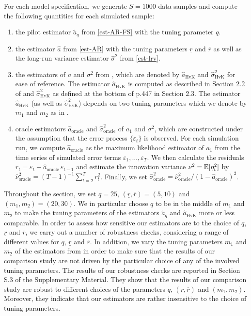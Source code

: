 For each model specification, we generate $S=1000$ data samples and compute the following quantities for each simulated sample: 
\begin{enumerate}[label=(\roman*),leftmargin=0.9cm]
\item the pilot estimator $\widetilde{a}_q$ from \eqref{est-AR-FS} with the tuning parameter $q$.
\item the estimator $\widehat{a}$ from \eqref{est-AR} with the tuning parameters $\underline{r}$ and $\overline{r}$ as well as the long-run variance estimator $\widehat{\sigma}^2$ from \eqref{est-lrv}. 
\item the estimators of $a$ and $\sigma^2$ from \cite{Hall2003}, which are denoted by $\widehat{a}_{\text{HvK}}$ and $\widehat{\sigma}^2_{\text{HvK}}$ for ease of reference. The estimator $\widehat{a}_{\text{HvK}}$ is computed as described in Section 2.2 of \cite{Hall2003} and $\widehat{\sigma}^2_{\text{HvK}}$ as defined at the bottom of p.447 in Section 2.3. The estimator $\widehat{a}_{\text{HvK}}$ (as well as $\widehat{\sigma}^2_{\text{HvK}}$) depends on two tuning parameters which we denote by $m_1$ and $m_2$ as in \cite{Hall2003}. 
\item oracle estimators $\widehat{a}_{\text{oracle}}$ and $\widehat{\sigma}^2_{\text{oracle}}$ of $a_1$ and $\sigma^2$, which are constructed under the assumption that the error process $\{\varepsilon_t\}$ is observed. For each simulation run, we compute $\widehat{a}_{\text{oracle}}$ as the maximum likelihood estimator of $a_1$ from the time series of simulated error terms $\varepsilon_1,\ldots,\varepsilon_T$. We then calculate the residuals $r_t = \varepsilon_t - \widehat{a}_{\text{oracle}} \, \varepsilon_{t-1}$ and estimate the innovation variance $\nu^2 = \mathbb{E}[\eta_t^2]$ by $\widehat{\nu}_{\text{oracle}}^2 = (T-1)^{-1} \sum_{t=2}^T r_t^2$. Finally, we set $\widehat{\sigma}^2_{\text{oracle}} = \widehat{\nu}_{\text{oracle}}^2 / (1 - \widehat{a}_{\text{oracle}})^2$. 
\end{enumerate}
Throughout the section, we set $q = 25$, $(\underline{r},\overline{r}) = (5,10)$ and $(m_1,m_2) = (20,30)$. We in particular choose $q$ to be in the middle of $m_1$ and $m_2$ to make the tuning parameters of the estimators $\widetilde{a}_q$ and $\widehat{a}_{\text{HvK}}$ more or less comparable. In order to assess how sensitive our estimators are to the choice of $q$, $\underline{r}$ and $\overline{r}$, we carry out a number of robustness checks, considering a range of different values for $q$, $\underline{r}$ and $\overline{r}$. In addition, we vary the tuning parameters $m_1$ and $m_2$ of the estimators from \cite{Hall2003} in order to make sure that the results of our comparison study are not driven by the particular choice of any of the involved tuning parameters. The results of our robustness checks are reported in Section S.3 of the Supplementary Material. They show that the results of our comparison study are robust to %
different choices of the parameters $q$, $(\underline{r},\overline{r})$ and $(m_1,m_2)$. Moreover, they indicate that our estimators are rather insensitive to the choice of tuning parameters. 


